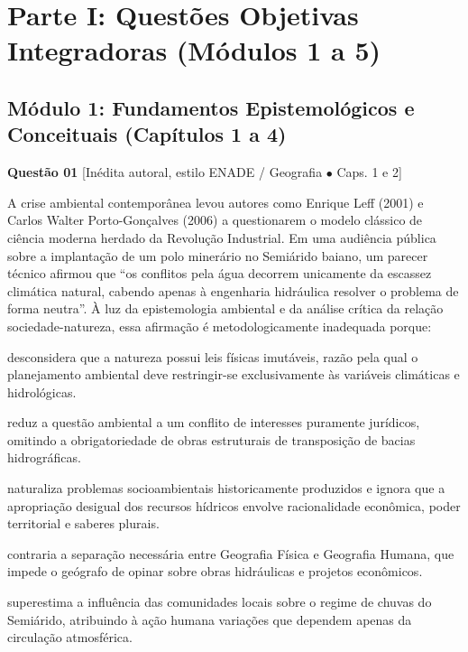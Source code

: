 \section*{Parte I: Questões Objetivas Integradoras (Módulos 1 a 5)}

\subsection*{Módulo 1: Fundamentos Epistemológicos e Conceituais (Capítulos 1 a 4)}

\noindent\textbf{Questão 01} {\footnotesize\color{uefsMuted}[Inédita autoral, estilo ENADE / Geografia $\bullet$ Caps. 1 e 2]}\par
A crise ambiental contemporânea levou autores como Enrique Leff (2001) e Carlos Walter Porto-Gonçalves (2006) a questionarem o modelo clássico de ciência moderna herdado da Revolução Industrial. Em uma audiência pública sobre a implantação de um polo minerário no Semiárido baiano, um parecer técnico afirmou que ``os conflitos pela água decorrem unicamente da escassez climática natural, cabendo apenas à engenharia hidráulica resolver o problema de forma neutra''. À luz da epistemologia ambiental e da análise crítica da relação sociedade-natureza, essa afirmação é metodologicamente inadequada porque:
\begin{alternativas}
  \item desconsidera que a natureza possui leis físicas imutáveis, razão pela qual o planejamento ambiental deve restringir-se exclusivamente às variáveis climáticas e hidrológicas.
  \item reduz a questão ambiental a um conflito de interesses puramente jurídicos, omitindo a obrigatoriedade de obras estruturais de transposição de bacias hidrográficas.
  \item naturaliza problemas socioambientais historicamente produzidos e ignora que a apropriação desigual dos recursos hídricos envolve racionalidade econômica, poder territorial e saberes plurais.
  \item contraria a separação necessária entre Geografia Física e Geografia Humana, que impede o geógrafo de opinar sobre obras hidráulicas e projetos econômicos.
  \item superestima a influência das comunidades locais sobre o regime de chuvas do Semiárido, atribuindo à ação humana variações que dependem apenas da circulação atmosférica.
\end{alternativas}

